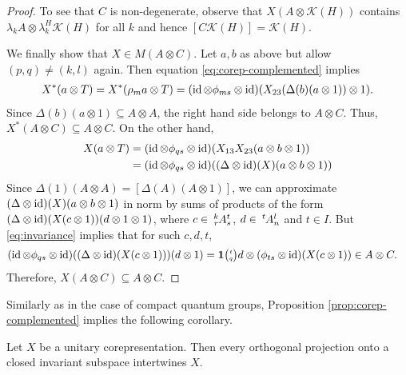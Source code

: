 \begin{proof}
To see that $C$ is non-degenerate, observe that $X(A\otimes
\mathcal{K}(H))$ contains $\lambda_{k}A \otimes
\lambda_{k}^{H}\mathcal{K}(H)$ for all $k$ and hence
$[C\mathcal{K}(H)]=\mathcal{K}(H)$.

We finally show that $X \in M(A\otimes C)$.  Let $a,b$ as above but
allow $(p,q)\neq (k,l)$ again. 
Then
equation \eqref{eq:corep-complemented}  implies 
\begin{align*}
  X^{*}(a\otimes T) = X^{*}(\rho_{m}a\otimes T) = (\operatorname{id} \otimes \phi_{ms}
  \otimes \operatorname{id})(X_{23}(\Delta(b)(a\otimes 1))\otimes 1).
\end{align*}
Since $\Delta(b)(a\otimes 1) \subseteq A\otimes A$, the right hand
side belongs to $A\otimes C$. Thus, $X^{*}(A\otimes C) \subseteq
A\otimes C$. On the other hand, 
\begin{align*}
  X(a\otimes T) &= (\operatorname{id} \otimes \phi_{qs} \otimes
  \operatorname{id})(X_{13}X_{23}(a\otimes b\otimes 1)) \\ &= (\operatorname{id} \otimes \phi_{qs}
  \otimes \operatorname{id})((\Delta \otimes \operatorname{id})(X)(a\otimes b\otimes 1)) 
\end{align*}
Since $\Delta(1)(A \otimes A) = [\Delta(A)(A \otimes 1)]$, we can
approximate $(\Delta \otimes \operatorname{id})(X)(a\otimes b\otimes 1)$ in norm by sums of
products of the form $(\Delta \otimes\operatorname{id})(X(c\otimes 1))(d \otimes
1\otimes 1)$, where %
$c\in \Gr{A}{k}{t}{r}{s}$, $d \in
\Gr{A}{t}{l}{}{n}$ and $t\in I$. But \eqref{eq:invariance} implies that for such $c,d,t$,
\begin{align*}
(\id \otimes \phi_{qs} 
  \otimes \id)(  (\Delta \otimes\id)(X(c\otimes 1)))(d \otimes %
1) &= \UnitC{t}{q}d \otimes (\phi_{ts} \otimes \id)(X(c\otimes 1)) \in A
\otimes C.
\end{align*}
Therefore, $X(A \otimes C) \subseteq A\otimes C$.
  \end{proof}

Similarly as in the case of compact quantum groups, Proposition \ref{prop:corep-complemented}
implies the following corollary. %
\begin{Cor} \label{cor:invariant-complemented}
  Let $X$ be a unitary corepresentation. Then every orthogonal projection onto a closed invariant
  subspace intertwines $X$.
\end{Cor}


